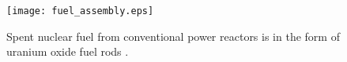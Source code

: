 \begin{figure}[htb!]
  \begin{center}
    \texttt{[image: fuel\_assembly.eps]}
  \end{center}
  \caption{Spent nuclear fuel from conventional power reactors is in the form of 
    uranium oxide fuel rods \cite{something}.}
  \label{fig:snf}
\end{figure}
